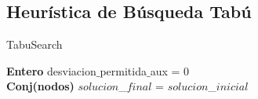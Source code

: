 

\subsection{Heurística de Búsqueda Tabú}

\begin{algorithm}[H]
    \SetAlgoLined
    \caption{TabuSearch}
		
	\textbf{Entero} desviacion$\_$permitida$\_$aux = 0 \\
	\textbf{Conj(nodos)} $solucion$\_$final$ = $solucion$\_$inicial$ \\
		

\end{algorithm}
